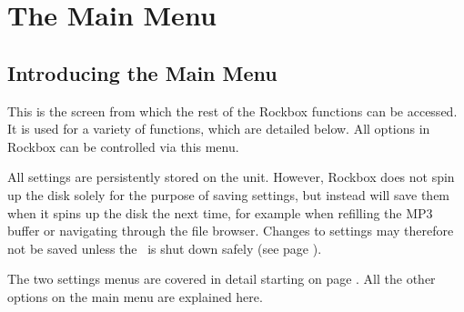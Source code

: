 \chapter{The Main Menu}

\section{Introducing the Main Menu}
This is the screen from which the rest of the Rockbox functions can be accessed. It is used for a variety of functions, which are detailed below. All options in Rockbox can be controlled via this menu.

All settings are persistently stored on the unit. However, Rockbox does not spin up the disk solely for the purpose of saving settings, but instead will save them when it spins up the disk the next time, for example when refilling the MP3 buffer or navigating through the file browser. Changes to settings may therefore not be saved unless the \dap\ is shut down safely (see page \pageref{ref:Safeshutdown}).

The two settings menus are covered in detail starting on page \pageref{ref:configure_rockbox}. All the other options on the main menu are explained here.

